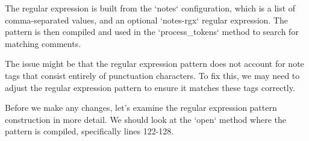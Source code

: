{\begin{agentbox}
The regular expression is built from the `notes` configuration, which is a list of comma-separated values, and an optional `notes-rgx` regular expression. The pattern is then compiled and used in the `process\_tokens` method to search for matching comments.



The issue might be that the regular expression pattern does not account for note tags that consist entirely of punctuation characters. To fix this, we may need to adjust the regular expression pattern to ensure it matches these tags correctly.



Before we make any changes, let's examine the regular expression pattern construction in more detail. We should look at the `open` method where the pattern is compiled, specifically lines 122-128.




\end{agentbox}}
